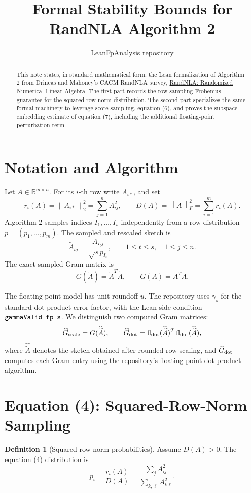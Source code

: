 \documentclass[11pt]{article}
\title{Formal Stability Bounds for RandNLA Algorithm 2}
\author{LeanFpAnalysis repository}
\date{}
\newcommand{\R}{\mathbb{R}}
\newcommand{\fl}{\operatorname{fl}}
\newcommand{\Frob}[1]{\left\lVert #1\right\rVert_F}
\newcommand{\Norm}[1]{\left\lVert #1\right\rVert_2}
\newcommand{\Atil}{\widetilde A}
\newcommand{\Ahat}{\widehat{\widetilde A}}
\newcommand{\D}{D}
\newcommand{\uunit}{u}
\newcommand{\lean}[1]{\texttt{\detokenize{#1}}}
\theoremstyle{definition}
\newtheorem{definition}[theorem]{Definition}
\theoremstyle{remark}
\begin{document}
\sloppy

\maketitle

\begin{abstract}
This note states, in standard mathematical form, the Lean formalization of
Algorithm 2 from Drineas and Mahoney's CACM RandNLA survey,
\href{https://dl.acm.org/doi/10.1145/2842602}{RandNLA: Randomized Numerical
Linear Algebra}.  The first part records the row-sampling Frobenius guarantee
for the squared-row-norm distribution.  The second part specializes the same
formal machinery to leverage-score sampling, equation (6), and proves the
subspace-embedding estimate of equation (7), including the additional
floating-point perturbation term.
\end{abstract}

\section{Notation and Algorithm}

Let \(A\in\R^{m\times n}\).  For its \(i\)-th row write \(A_{i*}\), and set
\[
  r_i(A)=\Norm{A_{i*}}^2=\sum_{j=1}^n A_{ij}^2,\qquad
  \D(A)=\Frob{A}^2=\sum_{i=1}^m r_i(A).
\]
Algorithm 2 samples indices \(I_1,\ldots,I_s\) independently from a row
distribution \(p=(p_1,\ldots,p_m)\).  The sampled and rescaled sketch is
\[
  \Atil_{tj}=\frac{A_{I_tj}}{\sqrt{s\,p_{I_t}}},
  \qquad 1\le t\le s,\quad 1\le j\le n .
\]
The exact sampled Gram matrix is
\[
  G(\Atil)=\Atil^T\Atil,\qquad
  G(A)=A^TA.
\]

The floating-point model has unit roundoff \(\uunit\).  The repository uses
\(\gamma_s\) for the standard dot-product error factor, with the Lean
side-condition \(\lean{gammaValid fp s}\).  We distinguish two computed Gram
matrices:
\[
  \widehat G_{\rm scale}=G(\Ahat),
  \qquad
  \widehat G_{\rm dot}=\fl_{\rm dot}(\Ahat)^T\fl_{\rm dot}(\Ahat),
\]
where \(\Ahat\) denotes the sketch obtained after rounded row scaling, and
\(\widehat G_{\rm dot}\) computes each Gram entry using the repository's
floating-point dot-product algorithm.

\section{Equation (4): Squared-Row-Norm Sampling}

\begin{definition}[Squared-row-norm probabilities]
Assume \(\D(A)>0\).  The equation (4) distribution is
\[
  p_i=\frac{r_i(A)}{\D(A)}
  =
  \frac{\sum_j A_{ij}^2}{\sum_{k,\ell} A_{k\ell}^2}.
\]
\end{definition}
\end{document}
